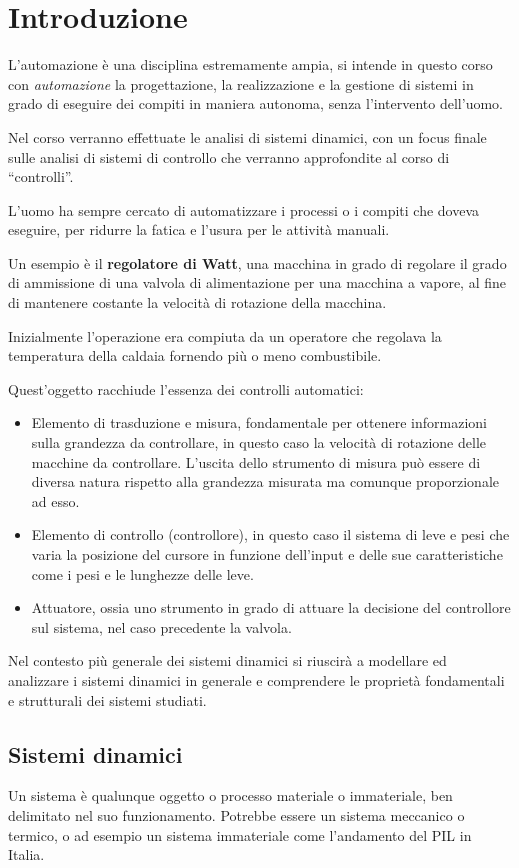 \chapter{Introduzione}
L'automazione è una disciplina estremamente ampia, si intende in questo corso con
\textit{automazione} la progettazione, la realizzazione e la gestione di sistemi in grado di
eseguire dei compiti in maniera autonoma, senza l'intervento dell'uomo.

Nel corso verranno effettuate le analisi di sistemi dinamici, con un focus finale sulle analisi di
sistemi di controllo che verranno approfondite al corso di ``controlli''.

L'uomo ha sempre cercato di automatizzare i processi o i compiti che doveva eseguire, per ridurre
la fatica e l'usura per le attività manuali.

Un esempio è il \textbf{regolatore di Watt}, una macchina in grado di regolare il grado di
ammissione di una valvola di alimentazione per una macchina a vapore, al fine di mantenere costante
la velocità di rotazione della macchina.

Inizialmente l'operazione era compiuta da un operatore che regolava la temperatura della caldaia
fornendo più o meno combustibile.

Quest'oggetto racchiude l'essenza dei controlli automatici:
\begin{itemize}
 \item Elemento di trasduzione e misura, fondamentale per ottenere informazioni sulla grandezza da
controllare, in questo caso la velocità di rotazione delle macchine da controllare. L'uscita dello
strumento di misura può essere di diversa natura rispetto alla grandezza misurata ma comunque
proporzionale ad esso.
 \item Elemento di controllo (controllore), in questo caso il sistema di leve e pesi che varia la
posizione del cursore in funzione dell'input e delle sue caratteristiche come i pesi e le lunghezze
delle leve.
\item Attuatore, ossia uno strumento in grado di attuare la decisione del controllore sul sistema,
nel caso precedente la valvola.
\end{itemize}

Nel contesto più generale dei sistemi dinamici si riuscirà a modellare ed analizzare i sistemi
dinamici in generale e comprendere le proprietà fondamentali e strutturali dei sistemi studiati.

\section{Sistemi dinamici}
Un sistema è qualunque oggetto o processo materiale o immateriale, ben delimitato nel suo
funzionamento.
Potrebbe essere un sistema meccanico o termico, o ad esempio un sistema immateriale come
l'andamento del PIL in Italia.

